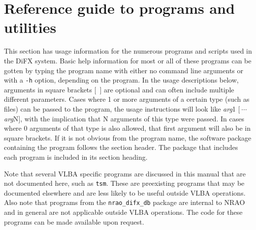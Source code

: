 



\section{Reference guide to programs and utilities} \label{sec:programs}

This section has usage information for the numerous programs and scripts used in the DiFX system.
Basic help information for most or all of these programs can be gotten by typing the program name with either no command line arguments or with a {\tt -h} option, depending on the program.
In the usage descriptions below, arguments in square brackets $[$\ $]$ are optional and can often include multiple different parameters.
Cases where 1 or more arguments of a certain type (such as files) can be passed to the program, the usage instructions will look like {\em arg}1 $[\ \cdots$ {\em arg}N$]$, with the implication that N arguments of this type were passed.
In cases where 0 arguments of that type is also allowed, that first argument will also be in square brackets.
If it is not obvious from the program name, the software package containing the program follows the section header.
The package that includes each program is included in its section heading.

Note that several VLBA specific programs are discussed in this manual that are not documented here, such as {\tt tsm}.
These are preexisting programs that may be documented elsewhere and are less likely to be useful outside VLBA operations.
Also note that programs from the {\tt nrao\_difx\_db} package are internal to NRAO and in general are not applicable outside VLBA operations.
The code for these programs can be made available upon request.








